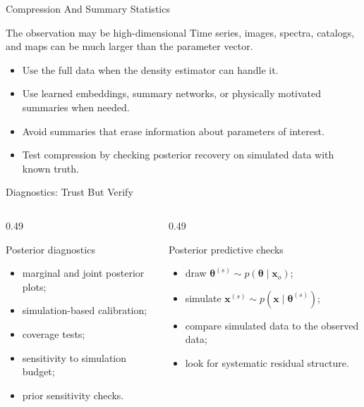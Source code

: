 \documentclass[aspectratio=169,11pt]{beamer}
\newcommand{\tightlist}{\setlength{\itemsep}{0.35em}}
\begin{document}
\begin{frame}{Compression And Summary Statistics}
  \begin{block}{The observation may be high-dimensional}
    Time series, images, spectra, catalogs, and maps can be much larger than the
    parameter vector.
  \end{block}

  \begin{itemize}\tightlist
    \item Use the full data when the density estimator can handle it.
    \item Use learned embeddings, summary networks, or physically motivated summaries when needed.
    \item Avoid summaries that erase information about parameters of interest.
    \item Test compression by checking posterior recovery on simulated data with known truth.
  \end{itemize}
\end{frame}

\begin{frame}{Diagnostics: Trust But Verify}
  \begin{columns}[T,onlytextwidth]
    \begin{column}{0.49\textwidth}
      \begin{block}{Posterior diagnostics}
        \begin{itemize}\tightlist
          \item marginal and joint posterior plots;
          \item simulation-based calibration;
          \item coverage tests;
          \item sensitivity to simulation budget;
          \item prior sensitivity checks.
        \end{itemize}
      \end{block}
    \end{column}
    \begin{column}{0.49\textwidth}
      \begin{block}{Posterior predictive checks}
        \begin{itemize}\tightlist
          \item draw $\bm{\theta}^{(s)}\sim p(\bm{\theta}\mid\bm{x}_o)$;
          \item simulate $\bm{x}^{(s)}\sim p(\bm{x}\mid\bm{\theta}^{(s)})$;
          \item compare simulated data to the observed data;
          \item look for systematic residual structure.
        \end{itemize}
      \end{block}
    \end{column}
  \end{columns}
\end{frame}
\end{document}
